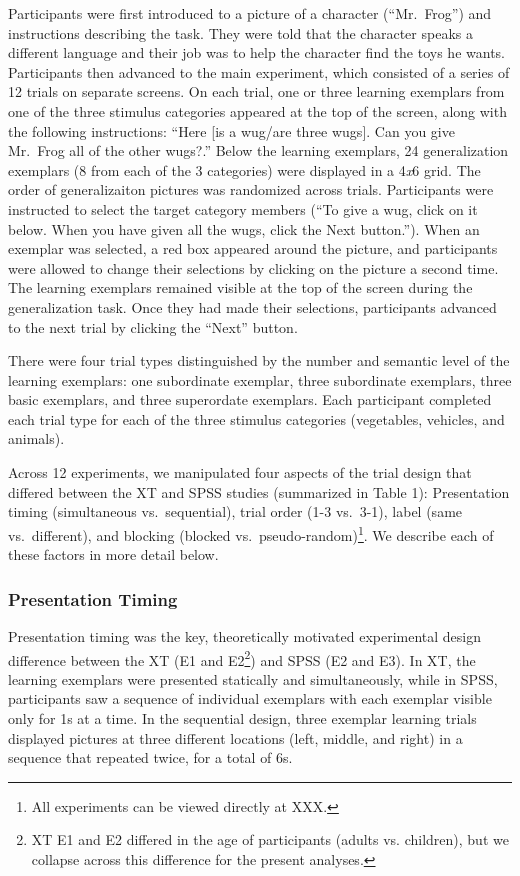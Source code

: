 \documentclass[english,floatsintext,man]{apa6}
\theoremstyle{definition}
\theoremstyle{definition}
\theoremstyle{remark}
\begin{document}
Participants were first introduced to a picture of a character
(\enquote{Mr.~Frog}) and instructions describing the task. They were
told that the character speaks a different language and their job was to
help the character find the toys he wants. Participants then advanced to
the main experiment, which consisted of a series of 12 trials on
separate screens. On each trial, one or three learning exemplars from
one of the three stimulus categories appeared at the top of the screen,
along with the following instructions: \enquote{Here {[}is a wug/are
three wugs{]}. Can you give Mr.~Frog all of the other wugs?.} Below the
learning exemplars, 24 generalization exemplars (8 from each of the 3
categories) were displayed in a 4\emph{x}6 grid. The order of
generalizaiton pictures was randomized across trials. Participants were
instructed to select the target category members (\enquote{To give a
wug, click on it below. When you have given all the wugs, click the Next
button.}). When an exemplar was selected, a red box appeared around the
picture, and participants were allowed to change their selections by
clicking on the picture a second time. The learning exemplars remained
visible at the top of the screen during the generalization task. Once
they had made their selections, participants advanced to the next trial
by clicking the \enquote{Next} button.

There were four trial types distinguished by the number and semantic
level of the learning exemplars: one subordinate exemplar, three
subordinate exemplars, three basic exemplars, and three superordate
exemplars. Each participant completed each trial type for each of the
three stimulus categories (vegetables, vehicles, and animals).

Across 12 experiments, we manipulated four aspects of the trial design
that differed between the XT and SPSS studies (summarized in Table 1):
Presentation timing (simultaneous vs.~sequential), trial order (1-3
vs.~3-1), label (same vs.~different), and blocking (blocked
vs.~pseudo-random)\footnote{All experiments can be viewed directly at XXX.}.
We describe each of these factors in more detail below.

\subsubsection{Presentation Timing}\label{presentation-timing}

Presentation timing was the key, theoretically motivated experimental
design difference between the XT (E1 and
E2\footnote{XT E1 and E2 differed in the age of participants (adults vs. children), but we collapse across this difference for the present analyses.})
and SPSS (E2 and E3). In XT, the learning exemplars were presented
statically and simultaneously, while in SPSS, participants saw a
sequence of individual exemplars with each exemplar visible only for 1s
at a time. In the sequential design, three exemplar learning trials
displayed pictures at three different locations (left, middle, and
right) in a sequence that repeated twice, for a total of 6s.
\end{document}
